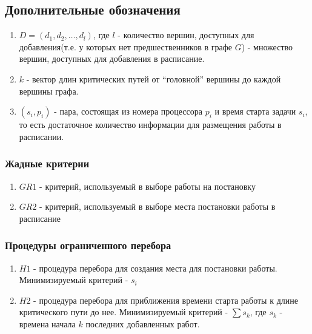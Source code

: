 \subsection{Дополнительные обозначения}
\begin{enumerate}
    \item $D= \left( d_1, d_2, \dots, d_l \right)$, где $l$ - количество вершин, доступных для добавления(т.е. у которых нет предшественников в графе $G$) - множество вершин, доступных для добавления в расписание.
    \item $k$ - вектор длин критических путей от ``головной'' вершины до каждой вершины графа.
    \item $\left( s_i, p_i \right)$ - пара, состоящая из номера процессора $p_i$ и время старта задачи $s_i$, то есть достаточное количество информации для размещения работы в расписании.
\end{enumerate}
\subsubsection*{Жадные критерии}
\begin{enumerate}
    \item $GR1$ - критерий, используемый в выборе работы на постановку
    \item $GR2$ - критерий, используемый в выборе места постановки работы в расписание
\end{enumerate}
\subsubsection*{Процедуры ограниченного перебора}
\begin{enumerate}
    \item $H1$ - процедура перебора для создания места для постановки работы. Минимизируемый критерий - $s_i$
    \item $H2$ - процедура перебора для приближения времени старта работы к длине критического пути до нее. Минимизируемый критерий - $\sum s_k$, где $s_k$ - времена начала $k$ последних добавленных работ.
\end{enumerate}

